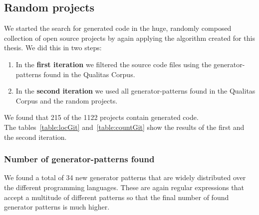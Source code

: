 



\cleardoublepage{}
\subsection{Random projects}
We started the search for generated code in the huge, randomly composed collection of open source projects by again applying the algorithm created for this thesis. We did this in two steps:
\begin{enumerate}
	\item In the \textbf{first iteration} we filtered the source code files using the generator-patterns found in the Qualitas Corpus.
	\item In the \textbf{second iteration} we used all generator-patterns found in the Qualitas Corpus and the random projects.
\end{enumerate} 
We found that 215 of the 1122 projects contain generated code. \\
The tables~\ref{table:locGit} and~\ref{table:countGit} show the results of the first and the second iteration. 

\subsubsection{Number of generator-patterns found}
We found a total of 34 new generator patterns that are widely distributed over the different programming languages. These are again regular expressions that accept a multitude of different patterns so that the final number of found generator patterns is much higher.

